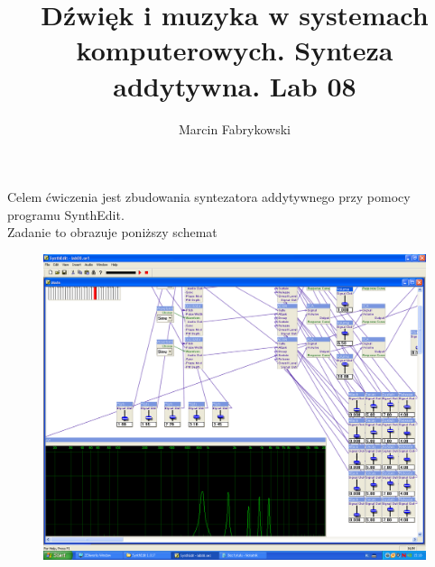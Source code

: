 \documentclass[a4paper,12pt]{article}
\title{Dźwięk i muzyka w systemach komputerowych. Synteza addytywna. Lab 08}
\author{Marcin Fabrykowski}
\date{}
\begin{document}
\maketitle
\newpage
Celem ćwiczenia jest zbudowania syntezatora addytywnego przy pomocy programu SynthEdit.\\
Zadanie to obrazuje poniższy schemat
\begin{figure}[h]
\hspace{-3.5cm}
\includegraphics[scale=0.45]{lab08.png}
\end{figure}
\end{document}
